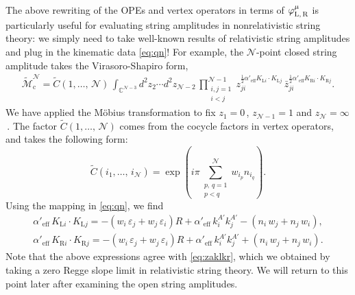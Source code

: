 \documentclass[11pt]{article}
\newcommand{\be}{\begin{equation}}
\newcommand{\ee}{\end{equation}}
\newcommand{\CN}{\mathcal{N}}
\newcommand{\CM}{\mathcal{M}}
\newcommand{\lr}{\left (}
\newcommand{\rr}{\right )}
\newcommand{\p}{\partial}
\renewcommand{\tilde}[1]{\widetilde{#1}}
\begin{document}
The above rewriting of the OPEs and vertex operators in terms of $\varphi^\mu_{\text{L,\,R}}$ is particularly useful for evaluating string amplitudes in nonrelativistic string theory: we simply need to take well-known results of relativistic string amplitudes and plug in the kinematic data \eqref{eq:qn}! For example, the $\CN$-point closed string amplitude takes the Virasoro-Shapiro form,
%
\begin{align} \label{eq:mcn}
    \tilde{\CM}^\CN_\text{c} = \tilde{C} (1, \dots, \, \CN) \, \int_{\mathbb{C}^{\CN-3}} d^2 z_2 \cdots d^2 z_{\CN-2}  \, \prod_{\substack{i,j = 1\\i<j}}^{\CN-1} z_{ji}^{\frac{1}{2} \alpha'_\text{eff} K_{\text{L}i} \cdot K_{\text{L}j}} \, \bar{z}_{ji}^{\frac{1}{2} \alpha'_\text{eff} K_{\text{R}i} \cdot K_{\text{R}j}} .
\end{align}
%
We have applied the M\"{o}bius transformation to fix $z_1 = 0$\,, $z_{\CN-1} = 1$ and $z_\CN = \infty$\,. The factor $\tilde{C} (1, \dots, \, \CN)$ comes from the cocycle factors in vertex operators, and takes the following form:
%
\be \label{eq:newcf}
    \tilde{C} (i_1, \dots, \, i_\CN) = \exp \lr i \pi {\sum}_{\substack{p,\,q=1\\p<q}}^\CN w_{i_p} n_{i_q} \rr\!.
\ee
%
Using the mapping in \eqref{eq:qn}, we find
%
\begin{subequations} \label{eq:kllrr}
\begin{align}
    \alpha'_\text{eff} \, K_{\text{L}i} \cdot K_{\text{L}j} = - \lr w_i \, \varepsilon_j + w_j \, \varepsilon_i \rr R + \alpha'_\text{eff} \, k_i^{A'} k^{A'}_j - \lr n_i \, w_j + n_j \, w_i \rr, \label{eq:klkl} \\[2pt]
    \alpha'_\text{eff} \, K_{\text{R}i} \cdot K_{\text{R}j} = - \lr w_i \, \varepsilon_j + w_j \, \varepsilon_i \rr R + \alpha'_\text{eff} \, k_i^{A'} k^{A'}_j + \lr n_i \, w_j + n_j \, w_i \rr. \label{eq:krkr}
\end{align}
\end{subequations}
%
Note that the above expressions agree with \eqref{eq:zaklkr}, which we obtained by taking a zero Regge slope limit in relativistic string theory.  We will return to this point later after examining the open string amplitudes.
\end{document}
